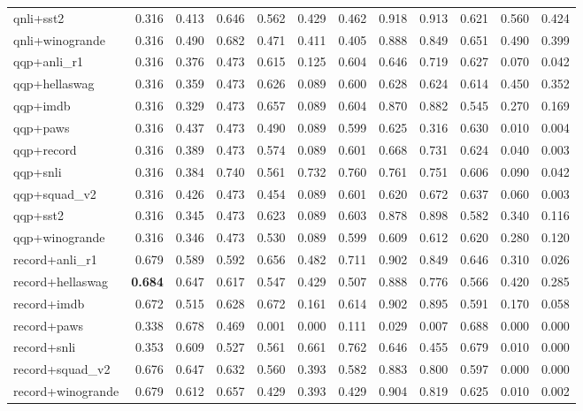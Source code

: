 \begin{table}[t]
\begin{tabular}{lrrrrrrrrrrr}
    qnli+sst2 & 0.316 & 0.413 & 0.646 & 0.562 & 0.429 & 0.462 & 0.918 & 0.913 & 0.621 & 0.560 & 0.424 \\
    qnli+winogrande & 0.316 & 0.490 & 0.682 & 0.471 & 0.411 & 0.405 & 0.888 & 0.849 & 0.651 & 0.490 & 0.399 \\
    qqp+anli\_r1 & 0.316 & 0.376 & 0.473 & 0.615 & 0.125 & 0.604 & 0.646 & 0.719 & 0.627 & 0.070 & 0.042 \\
    qqp+hellaswag & 0.316 & 0.359 & 0.473 & 0.626 & 0.089 & 0.600 & 0.628 & 0.624 & 0.614 & 0.450 & 0.352 \\
    qqp+imdb & 0.316 & 0.329 & 0.473 & 0.657 & 0.089 & 0.604 & 0.870 & 0.882 & 0.545 & 0.270 & 0.169 \\
    qqp+paws & 0.316 & 0.437 & 0.473 & 0.490 & 0.089 & 0.599 & 0.625 & 0.316 & 0.630 & 0.010 & 0.004 \\
    qqp+record & 0.316 & 0.389 & 0.473 & 0.574 & 0.089 & 0.601 & 0.668 & 0.731 & 0.624 & 0.040 & 0.003 \\
    qqp+snli & 0.316 & 0.384 & 0.740 & 0.561 & 0.732 & 0.760 & 0.761 & 0.751 & 0.606 & 0.090 & 0.042 \\
    qqp+squad\_v2 & 0.316 & 0.426 & 0.473 & 0.454 & 0.089 & 0.601 & 0.620 & 0.672 & 0.637 & 0.060 & 0.003 \\
    qqp+sst2 & 0.316 & 0.345 & 0.473 & 0.623 & 0.089 & 0.603 & 0.878 & 0.898 & 0.582 & 0.340 & 0.116 \\
    qqp+winogrande & 0.316 & 0.346 & 0.473 & 0.530 & 0.089 & 0.599 & 0.609 & 0.612 & 0.620 & 0.280 & 0.120 \\
    record+anli\_r1 & 0.679 & 0.589 & 0.592 & 0.656 & 0.482 & 0.711 & 0.902 & 0.849 & 0.646 & 0.310 & 0.026 \\
    record+hellaswag & \textbf{0.684} & 0.647 & 0.617 & 0.547 & 0.429 & 0.507 & 0.888 & 0.776 & 0.566 & 0.420 & 0.285 \\
    record+imdb & 0.672 & 0.515 & 0.628 & 0.672 & 0.161 & 0.614 & 0.902 & 0.895 & 0.591 & 0.170 & 0.058 \\
    record+paws & 0.338 & 0.678 & 0.469 & 0.001 & 0.000 & 0.111 & 0.029 & 0.007 & 0.688 & 0.000 & 0.000 \\
    record+snli & 0.353 & 0.609 & 0.527 & 0.561 & 0.661 & 0.762 & 0.646 & 0.455 & 0.679 & 0.010 & 0.000 \\
    record+squad\_v2 & 0.676 & 0.647 & 0.632 & 0.560 & 0.393 & 0.582 & 0.883 & 0.800 & 0.597 & 0.000 & 0.000 \\
    record+winogrande & 0.679 & 0.612 & 0.657 & 0.429 & 0.393 & 0.429 & 0.904 & 0.819 & 0.625 & 0.010 & 0.002 \\

\end{tabular}
\end{table}
